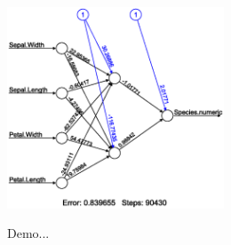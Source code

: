 \documentclass[a4paper,blends,pdf,colorBG,slideColor]{prosper}
\begin{document}
\es

\begin{center}
\includegraphics[height=60mm]{images/ann-plot.eps}
\end{center}
\es


Demo...

\es
\end{document}
